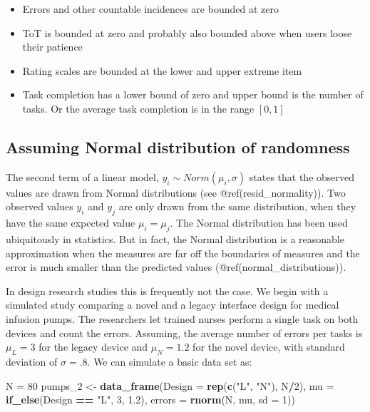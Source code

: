 \documentclass[]{svmono}
\newenvironment{Shaded}{\begin{snugshade}}{\end{snugshade}}
\newcommand{\KeywordTok}[1]{\textcolor[rgb]{0.13,0.29,0.53}{\textbf{#1}}}
\newcommand{\DataTypeTok}[1]{\textcolor[rgb]{0.13,0.29,0.53}{#1}}
\newcommand{\DecValTok}[1]{\textcolor[rgb]{0.00,0.00,0.81}{#1}}
\newcommand{\FloatTok}[1]{\textcolor[rgb]{0.00,0.00,0.81}{#1}}
\newcommand{\StringTok}[1]{\textcolor[rgb]{0.31,0.60,0.02}{#1}}
\newcommand{\OperatorTok}[1]{\textcolor[rgb]{0.81,0.36,0.00}{\textbf{#1}}}
\newcommand{\NormalTok}[1]{#1}
\providecommand{\tightlist}{%
  \setlength{\itemsep}{0pt}\setlength{\parskip}{0pt}}
\begin{document}
\begin{itemize}
\tightlist
\item
  Errors and other countable incidences are bounded at zero
\item
  ToT is bounded at zero and probably also bounded above when users
  loose their patience
\item
  Rating scales are bounded at the lower and upper extreme item
\item
  Task completion has a lower bound of zero and upper bound is the
  number of tasks. Or the average task completion is in the range
  \([0,1]\)
\end{itemize}

\subsection{Assuming Normal distribution of
randomness}\label{assuming-normal-distribution-of-randomness}

The second term of a linear model, \(y_i \sim Norm(\mu_i, \sigma)\)
states that the observed values are drawn from Normal distributions (see
@ref(resid\_normality)). Two observed values \(y_i\) and \(y_j\) are
only drawn from the same distribution, when they have the same expected
value \(\mu_i = \mu_j\). The Normal distribution has been used
ubiquitously in statistics. But in fact, the Normal distribution is a
reasonable approximation when the measures are far off the boundaries of
measures and the error is much smaller than the predicted values
(@ref(normal\_distributions)).

In design research studies this is frequently not the case. We begin
with a simulated study comparing a novel and a legacy interface design
for medical infusion pumps. The researchers let trained nurses perform a
single task on both devices and count the errors. Assuming, the average
number of errors per tasks is \(\mu_L = 3\) for the legacy device and
\(\mu_N = 1.2\) for the novel device, with standard deviation of
\(\sigma = .8\). We can simulate a basic data set as:

\begin{Shaded}
\begin{Highlighting}[]
\NormalTok{N =}\StringTok{ }\DecValTok{80}
\NormalTok{pumps_}\DecValTok{2}\NormalTok{ <-}\StringTok{ }
\StringTok{  }\KeywordTok{data_frame}\NormalTok{(}\DataTypeTok{Design =} \KeywordTok{rep}\NormalTok{(}\KeywordTok{c}\NormalTok{(}\StringTok{"L"}\NormalTok{, }\StringTok{"N"}\NormalTok{), N}\OperatorTok{/}\DecValTok{2}\NormalTok{),}
             \DataTypeTok{mu =} \KeywordTok{if_else}\NormalTok{(Design }\OperatorTok{==}\StringTok{ "L"}\NormalTok{, }\DecValTok{3}\NormalTok{, }\FloatTok{1.2}\NormalTok{),}
             \DataTypeTok{errors =} \KeywordTok{rnorm}\NormalTok{(N, mu, }\DataTypeTok{sd =} \DecValTok{1}\NormalTok{))}
\end{Highlighting}
\end{Shaded}
\end{document}
